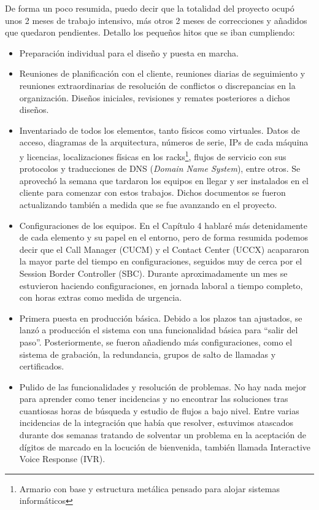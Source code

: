 \documentclass[a4paper, 12pt]{book}
\begin{document}
De forma un poco resumida, puedo decir que la totalidad del proyecto ocupó unos 2 meses de trabajo intensivo, más otros 2 meses de correcciones y añadidos que quedaron pendientes. Detallo los pequeños hitos que se iban cumpliendo:
\begin{itemize}
  \item Preparación individual para el diseño y puesta en marcha.
  
  \item Reuniones de planificación con el cliente, reuniones diarias de seguimiento y reuniones extraordinarias de resolución de conflictos o discrepancias en la organización. Diseños iniciales, revisiones y remates posteriores a dichos diseños.

  \item Inventariado de todos los elementos, tanto físicos como virtuales. Datos de acceso, diagramas de la arquitectura, números de serie, IPs de cada máquina y licencias, localizaciones físicas en los racks\footnote{Armario con base y estructura metálica pensado para alojar sistemas informáticos}, flujos de servicio con sus protocolos y traducciones de DNS (\emph{Domain Name System}), entre otros. Se aprovechó la semana que tardaron los equipos en llegar y ser instalados en el cliente para comenzar con estos trabajos. Dichos documentos se fueron actualizando también a medida que se fue avanzando en el proyecto.

  \item Configuraciones de los equipos. En el Capítulo 4 hablaré más detenidamente de cada elemento y su papel en el entorno, pero de forma resumida podemos decir que el Call Manager (CUCM) y el Contact Center (UCCX) acapararon la mayor parte del tiempo en configuraciones, seguidos muy de cerca por el Session Border Controller (SBC). Durante aproximadamente un mes se estuvieron haciendo configuraciones, en jornada laboral a tiempo completo, con horas extras como medida de urgencia.

  \item Primera puesta en producción básica. Debido a los plazos tan ajustados, se lanzó a producción el sistema con una funcionalidad básica para ``salir del paso''. Posteriormente, se fueron añadiendo más configuraciones, como el sistema de grabación, la redundancia, grupos de salto de llamadas y certificados.

  \item Pulido de las funcionalidades y resolución de problemas. No hay nada mejor para aprender como tener incidencias y no encontrar las soluciones tras cuantiosas horas de búsqueda y estudio de flujos a bajo nivel. Entre varias incidencias de la integración que había que resolver, estuvimos atascados durante dos semanas tratando de solventar un problema en la aceptación de dígitos de marcado en la locución de bienvenida, también llamada Interactive Voice Response (IVR).
  

\end{itemize}
\end{document}
